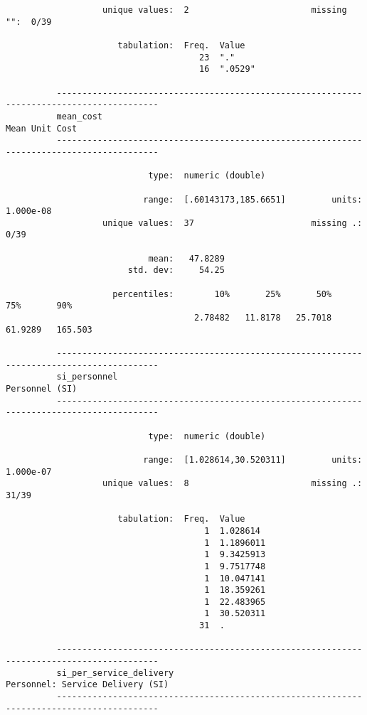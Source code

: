 \documentclass{article}
\begin{document}
\begin{verbatim}
                   unique values:  2                        missing "":  0/39
          
                      tabulation:  Freq.  Value
                                      23  "."
                                      16  ".0529"
          
          ------------------------------------------------------------------------------------------
          mean_cost                                                                   Mean Unit Cost
          ------------------------------------------------------------------------------------------
          
                            type:  numeric (double)
          
                           range:  [.60143173,185.6651]         units:  1.000e-08
                   unique values:  37                       missing .:  0/39
          
                            mean:   47.8289
                        std. dev:     54.25
          
                     percentiles:        10%       25%       50%       75%       90%
                                     2.78482   11.8178   25.7018   61.9289   165.503
          
          ------------------------------------------------------------------------------------------
          si_personnel                                                                Personnel (SI)
          ------------------------------------------------------------------------------------------
          
                            type:  numeric (double)
          
                           range:  [1.028614,30.520311]         units:  1.000e-07
                   unique values:  8                        missing .:  31/39
          
                      tabulation:  Freq.  Value
                                       1  1.028614
                                       1  1.1896011
                                       1  9.3425913
                                       1  9.7517748
                                       1  10.047141
                                       1  18.359261
                                       1  22.483965
                                       1  30.520311
                                      31  .
          
          ------------------------------------------------------------------------------------------
          si_per_service_delivery                                   Personnel: Service Delivery (SI)
          ------------------------------------------------------------------------------------------
          

\end{verbatim}
\end{document}
